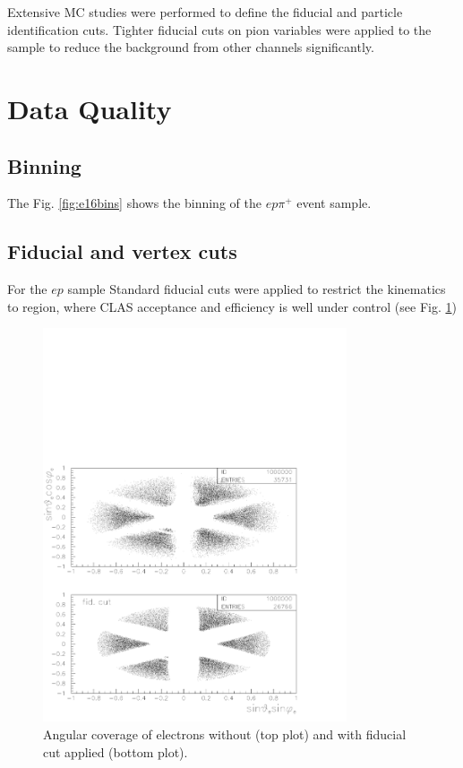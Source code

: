\documentclass[11pt,a4paper]{article}
\begin{document}
Extensive MC studies were performed
to define the fiducial and particle identification cuts. Tighter fiducial
cuts on pion variables were applied to the  sample to reduce the background from
other channels significantly.



\section{Data Quality}

\subsection{Binning}
The Fig. \ref{fig:e16bins} shows the binning of the $ep\pi^+$ event sample. 


\subsection{Fiducial and vertex cuts}

For the $ep$ sample Standard fiducial cuts were applied to restrict the kinematics to region,
where CLAS acceptance and efficiency is well under control 
(see Fig. \ref{fig:e16thvsphi})
\begin{figure}
\centering
\includegraphics[width=0.8\textwidth]{plots/e16thvsphi.pdf}
   \caption{ Angular coverage of electrons without (top plot) and
with fiducial cut applied (bottom plot). }
 \label{fig:e16thvsphi}
 \end{figure} 
\end{document}
